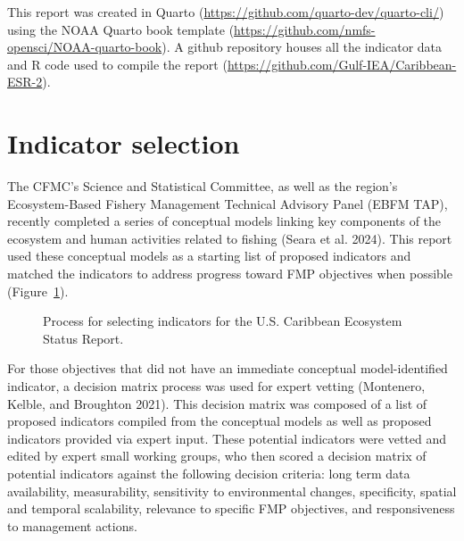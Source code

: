 \documentclass[
  letterpaper,
  oneside,
  open=any]{scrbook}
\begin{document}
This report was created in Quarto
(\url{https://github.com/quarto-dev/quarto-cli/}) using the NOAA Quarto
book template
(\hyperref[0]{https://github.com/nmfs-opensci/NOAA-quarto-book}). A
github repository houses all the indicator data and R code used to
compile the report
(\hyperref[0]{https://github.com/Gulf-IEA/Caribbean-ESR-2}).

\section{Indicator selection}\label{indicator-selection}

The CFMC's Science and Statistical Committee, as well as the region's
Ecosystem-Based Fishery Management Technical Advisory Panel (EBFM TAP),
recently completed a series of conceptual models linking key components
of the ecosystem and human activities related to fishing (Seara et al.
2024). This report used these conceptual models as a starting list of
proposed indicators and matched the indicators to address progress
toward FMP objectives when possible (Figure~\ref{fig-flowchart}).

\begin{figure}


\caption{\label{fig-flowchart}Process for selecting indicators for the
U.S. Caribbean Ecosystem Status Report.}

\end{figure}%

For those objectives that did not have an immediate conceptual
model-identified indicator, a decision matrix process was used for
expert vetting (Montenero, Kelble, and Broughton 2021). This decision
matrix was composed of a list of proposed indicators compiled from the
conceptual models as well as proposed indicators provided via expert
input. These potential indicators were vetted and edited by expert small
working groups, who then scored a decision matrix of potential
indicators against the following decision criteria: long term data
availability, measurability, sensitivity to environmental changes,
specificity, spatial and temporal scalability, relevance to specific FMP
objectives, and responsiveness to management actions.
\end{document}
